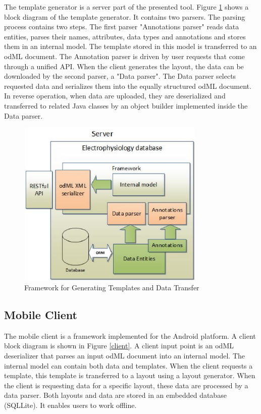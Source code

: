 \documentclass[conference]{IEEEtran}
\begin{document}
The template generator is a server part of the presented tool. Figure \ref{framework} shows a block diagram of the template generator. It contains two parsers. The parsing process contains two steps. The first parser "Annotations parser" reads data entities, parses their names, attributes, data types and annotations and stores them in an internal model. The template stored in this model is transferred to an odML document. The Annotation parser is driven by user requests that come through a unified API. When the client generates the layout, the data can be downloaded by the second parser, a "Data parser". The Data parser selects requested data and serializes them into the equally structured odML document. In reverse operation,  when data are uploaded, they are deserialized and transferred to related Java classes by an object builder implemented inside the Data parser.



\begin{figure}
\centering\includegraphics[width=9cm, height=8cm]{Framework}
\caption{\label{framework}Framework for Generating Templates and Data Transfer}

\end{figure}


\subsection{Mobile Client}

The mobile client is a framework implemented for the Android platform. A client block diagram is shown in Figure \ref{client}. A client input point is an odML deserializer that parses an input odML document into an internal model. The internal model can contain both data and templates. When the client requests a template, this template is transferred to a layout using a layout generator. When the client is requesting data for a specific layout, these data are processed by a data parser. Both layouts and data are stored in an embedded database (SQLLite). It enables users to work offline.
\end{document}
